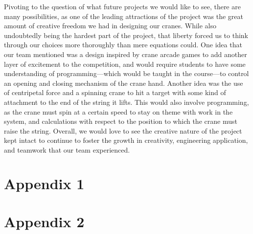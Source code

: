 \documentclass[letterpaper, 12pt]{article}
\begin{document}
Pivoting to the question of what future projects we would like to see, there are many possibilities, as one of the leading attractions of the project was the great amount of creative freedom we had in designing our cranes. 
While also undoubtedly being the hardest part of the project, that liberty forced us to think through our choices more thoroughly than mere equations could. 
One idea that our team mentioned was a design inspired by crane arcade games to add another layer of excitement to the competition, and would require students to have some understanding of programming—which would be taught in the course—to control an opening and closing mechanism of the crane hand. 
Another idea was the use of centripetal force and a spinning crane to hit a target with some kind of attachment to the end of the string it lifts. 
This would also involve programming, as the crane must spin at a certain speed to stay on theme with work in the system, and calculations with respect to the position to which the crane must raise the string. 
Overall, we would love to see the creative nature of the project kept intact to continue to foster the growth in creativity, engineering application, and teamwork that our team experienced.

\section*{Appendix 1}













\section*{Appendix 2}

\end{document}
